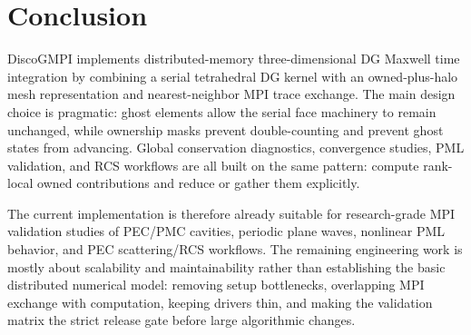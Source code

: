 \documentclass[11pt]{article}
\begin{document}
\section{Conclusion}

DiscoGMPI implements distributed-memory three-dimensional DG Maxwell time
integration by combining a serial tetrahedral DG kernel with an owned-plus-halo
mesh representation and nearest-neighbor MPI trace exchange.  The main design
choice is pragmatic: ghost elements allow the serial face machinery to remain
unchanged, while ownership masks prevent double-counting and prevent ghost
states from advancing.  Global conservation diagnostics, convergence studies,
PML validation, and RCS workflows are all built on the same pattern: compute
rank-local owned contributions and reduce or gather them explicitly.

The current implementation is therefore already suitable for research-grade
MPI validation studies of PEC/PMC cavities, periodic plane waves, nonlinear
PML behavior, and PEC scattering/RCS workflows.  The remaining engineering
work is mostly about scalability and maintainability rather than establishing
the basic distributed numerical model: removing setup bottlenecks, overlapping
MPI exchange with computation, keeping drivers thin, and making the validation
matrix the strict release gate before large algorithmic changes.
\end{document}
